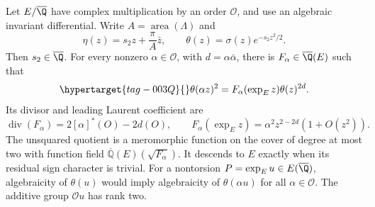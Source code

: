 \begin{proposition}\hypertarget{tag-001F}{}\label{ari:C.7.6}

Let $E/\overline{\Q}$ have complex multiplication by an order
$\mathcal O$, and use an algebraic invariant differential. Write
$A=\operatorname{area}(\Lambda)$ and
\[
 \eta(z)=s_2z+\frac{\pi}{A}\bar z,\qquad
 \theta(z)=\sigma(z)e^{-s_2z^2/2}.
\]
Then $s_2\in\overline{\Q}$. For every nonzero
$\alpha\in\mathcal O$, with $d=\alpha\bar\alpha$, there is
$F_\alpha\in\overline{\Q}(E)$ such that
\begin{equation}\hypertarget{tag-003Q}{}\label{ari:eq:ct-CMmult}
 \theta(\alpha z)^2=F_\alpha(\exp_E z)\theta(z)^{2d}.
\end{equation}
Its divisor and leading Laurent coefficient are
\[
 \operatorname{div}(F_\alpha)=2[\alpha]^*(O)-2d(O),\qquad
 F_\alpha(\exp_Ez)=\alpha^2z^{2-2d}(1+O(z^2)).
\]
The unsquared quotient is a meromorphic function on the
cover of degree at most two with function field
$\overline{\mathbb Q}(E)(\sqrt{F_\alpha})$.
It descends to $E$ exactly when its residual sign character is trivial. For a nontorsion
$P=\exp_Eu\in E(\overline{\Q})$, algebraicity of $\theta(u)$
would imply algebraicity of $\theta(\alpha u)$ for all
$\alpha\in\mathcal O$. The additive group $\mathcal O u$ has rank two.
\end{proposition}


